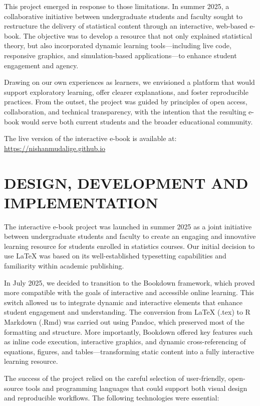 \documentclass[11pt]{article}
\begin{document}
This project emerged in response to those limitations. In summer 2025, a collaborative initiative between undergraduate students and faculty sought to restructure the delivery of statistical content through an interactive, web-based e-book. The objective was to develop a resource that not only explained statistical theory, but also incorporated dynamic learning tools—including live code, responsive graphics, and simulation-based applications—to enhance student engagement and agency.

Drawing on our own experiences as learners, we envisioned a platform that would support exploratory learning, offer clearer explanations, and foster reproducible practices. From the outset, the project was guided by principles of open access, collaboration, and technical transparency, with the intention that the resulting e-book would serve both current students and the broader educational community.

The live version of the interactive e-book is available at:
\url{https://nishanmudalige.github.io}


\section{DESIGN, DEVELOPMENT AND IMPLEMENTATION}

The interactive e-book project was launched in summer 2025 as a joint initiative between undergraduate students and faculty to create an engaging and innovative learning resource for students enrolled in statistics courses. Our initial decision to use LaTeX was based on its well-established typesetting capabilities and familiarity within academic publishing.

In July 2025, we decided to transition to the Bookdown framework, which proved more compatible with the goals of interactive and accessible online learning. This switch allowed us to integrate dynamic and interactive elements that enhance student engagement and understanding. The conversion from LaTeX (.tex) to R Markdown (.Rmd) was carried out using Pandoc, which preserved most of the formatting and structure. More importantly, Bookdown offered key features such as inline code execution, interactive graphics, and dynamic cross-referencing of equations, figures, and tables—transforming static content into a fully interactive learning resource.

The success of the project relied on the careful selection of user-friendly, open-source tools and programming languages that could support both visual design and reproducible workflows. The following technologies were essential:
\end{document}
